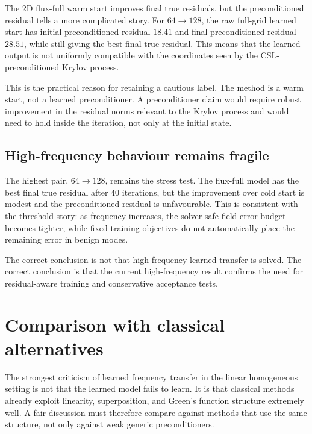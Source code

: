 The 2D flux-full warm start improves final true residuals, but the
preconditioned residual tells a more complicated story. For $64\to128$, the
raw full-grid learned start has initial preconditioned residual $18.41$ and
final preconditioned residual $28.51$, while still giving the best final true
residual. This means that the learned output is not uniformly compatible with
the coordinates seen by the CSL-preconditioned Krylov process.

This is the practical reason for retaining a cautious label. The method is a
warm start, not a learned preconditioner. A preconditioner claim would require
robust improvement in the residual norms relevant to the Krylov process and
would need to hold inside the iteration, not only at the initial state.

\subsection{High-frequency behaviour remains fragile}
\label{subsec:discussion-high-frequency}

The highest pair, $64\to128$, remains the stress test. The flux-full model has
the best final true residual after $40$ iterations, but the improvement over
cold start is modest and the preconditioned residual is unfavourable. This is
consistent with the threshold story: as frequency increases, the solver-safe
field-error budget becomes tighter, while fixed training objectives do not
automatically place the remaining error in benign modes.

The correct conclusion is not that high-frequency learned transfer is solved.
The correct conclusion is that the current high-frequency result confirms the
need for residual-aware training and conservative acceptance tests.

\section{Comparison with classical alternatives}
\label{sec:discussion-classical}

The strongest criticism of learned frequency transfer in the linear
homogeneous setting is not that the learned model fails to learn. It is that
classical methods already exploit linearity, superposition, and Green's
function structure extremely well. A fair discussion must therefore compare
against methods that use the same structure, not only against weak generic
preconditioners.

